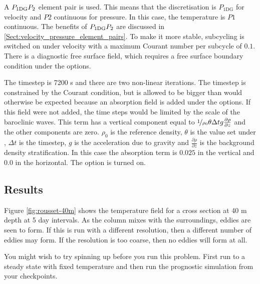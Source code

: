 A $P_{1\mathrm{DG}}P_2$ element pair is used. This means that the discretisation is $P_{1\mathrm{DG}}$ for velocity and  $P2$ continuous for pressure. In this case, the temperature is $P1$ continuous. The benefits of $P_{1\mathrm{DG}}P_2$ are discussed in \ref{Sect:velocity_pressure_element_pairs}.  To make it more stable, subcycling is switched on under velocity with a maximum Courant number per subcycle of $0.1$. There is a diagnostic free surface field, which requires a free surface boundary condition under the  options.

The timestep is 7200 s and there are two non-linear iterations.  The timestep is constrained by the Courant condition, but is allowed to be bigger than would otherwise be expected because an absorption field is added under the  options.  If this field were not added, the time steps would be limited by the scale of the baroclinic waves.  This term has a vertical component equal to  ${\nicefrac{1}{\rho_0}} {\theta} {\Delta} {t} {g} {\frac{\partial \rho}{\partial z}}$ and the other components are zero. $\rho_0$ is the reference density, $\theta$ is the value set under , ${\Delta} {t} $ is the timestep, $g$ is the acceleration due to gravity and $\frac{\partial \rho}{\partial z}$ is the background density stratification.   In this case the absorption term is $0.025$ in the vertical and $0.0$ in the horizontal. The  option is turned on. 

\subsection{Results}

Figure \ref{fig:rousset-40m} shows the temperature field for a cross section at 40 m depth at 5 day intervals. As the column mixes with the surroundings, eddies are seen to form. If this is run with a different resolution, then a different number of eddies may form. If the resolution is too coarse, then no eddies will form at all.

You might wish to try spinning up before you run this problem.  First run to a steady state with fixed temperature and then run the prognostic simulation from your checkpoints.

